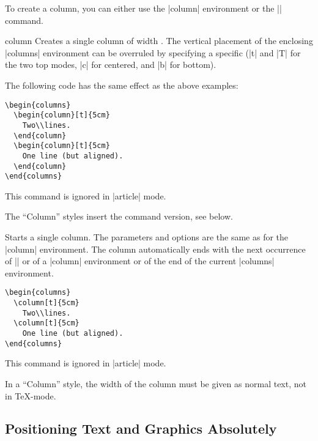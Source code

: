 To create a column, you can either use the |column| environment or the
|\column| command.

\begin{environment}{{column}}
  Creates a single column of width . The vertical
  placement of the enclosing |columns| environment can be overruled by
  specifying a specific  (|t| and |T| for the two top
  modes, |c| for centered, and |b| for bottom).

  \example The following code has the same effect as the above examples:
\begin{verbatim}
\begin{columns}
  \begin{column}[t]{5cm}
    Two\\lines.
  \end{column}
  \begin{column}[t]{5cm}
    One line (but aligned).
  \end{column}
\end{columns}
\end{verbatim}
  \articlenote
  This command is ignored in |article| mode.

  \lyxnote
  The ``Column'' styles insert the command version, see below.
\end{environment}

\begin{command}{{\column}}
  Starts a single column. The parameters and options are the same as
  for the |column| environment. The column automatically ends with the
  next occurrence of |\column| or of a |column| environment or of the
  end of the current |columns| environment.

  \example
\begin{verbatim}
\begin{columns}
  \column[t]{5cm}
    Two\\lines.
  \column[t]{5cm}
    One line (but aligned).
\end{columns}
\end{verbatim}
  \articlenote
  This command is ignored in |article| mode.

  \lyxnote
  In a ``Column'' style, the width of the column must be given as
  normal text, not in \TeX-mode.
\end{command}



\subsection{Positioning Text and Graphics Absolutely}

